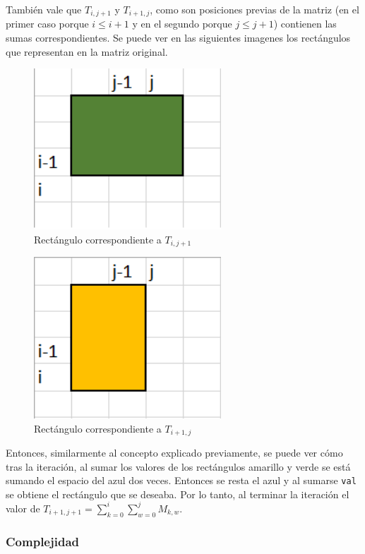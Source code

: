 También vale que $T_{i,j+1}$ y $T_{i+1,j}$, como son posiciones previas de la matriz (en el primer caso porque $i \leq i+1$ y en el segundo porque $j \leq j+1$) contienen las sumas correspondientes. Se puede ver en las siguientes imagenes los rectángulos que representan en la matriz original.

\begin{figure}[H]
\centering
\includegraphics[width=7cm]{Imagenes/Ej3g.png}
\caption{Rectángulo correspondiente a $T_{i,j+1}$}
\end{figure}

\begin{figure}[H]
\centering
\includegraphics[width=7cm]{Imagenes/Ej3h.png}
\caption{Rectángulo correspondiente a $T_{i+1,j}$}
\end{figure}

Entonces, similarmente al concepto explicado previamente, se puede ver cómo tras la iteración, al sumar los valores de los rectángulos amarillo y verde se está sumando el espacio del azul dos veces. Entonces se resta el azul y al sumarse \texttt{val} se obtiene el rectángulo que se deseaba. Por lo tanto, al terminar la iteración el valor de $T_{i+1,j+1} = \sum_{k=0}^{i} \sum_{w=0}^{j} M_{k,w}$.

\subsubsection{Complejidad}

